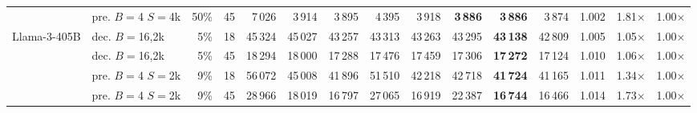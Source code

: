 \begin{table}[t]
{\begin{tabular}{llrrrrrrrrrrrrr}
 & pre. $B{=}$4 $S{=}$4k & 50\% & 45 & 7\,026 & 3\,914 & 3\,895 & 4\,395 & 3\,918 & \textbf{3\,886} & \textbf{3\,886} & 3\,874 & 1.002 & 1.81$\times$ & 1.00$\times$\\
Llama-3-405B & dec. $B{=}$16,2k & 5\% & 18 & 45\,324 & 45\,027 & 43\,257 & 43\,313 & 43\,263 & 43\,295 & \textbf{43\,138} & 42\,809 & 1.005 & 1.05$\times$ & 1.00$\times$\\
 & dec. $B{=}$16,2k & 5\% & 45 & 18\,294 & 18\,000 & 17\,288 & 17\,476 & 17\,459 & 17\,306 & \textbf{17\,272} & 17\,124 & 1.010 & 1.06$\times$ & 1.00$\times$\\
 & pre. $B{=}$4 $S{=}$2k & 9\% & 18 & 56\,072 & 45\,008 & 41\,896 & 51\,510 & 42\,218 & 42\,718 & \textbf{41\,724} & 41\,165 & 1.011 & 1.34$\times$ & 1.00$\times$\\
 & pre. $B{=}$4 $S{=}$2k & 9\% & 45 & 28\,966 & 18\,019 & 16\,797 & 27\,065 & 16\,919 & 22\,387 & \textbf{16\,744} & 16\,466 & 1.014 & 1.73$\times$ & 1.00$\times$\\
\bottomrule
\end{tabular}}
\end{table}
